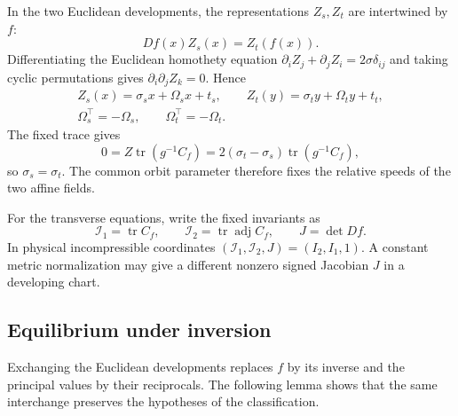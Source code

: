 \documentclass[11pt,a4paper]{article}
\numberwithin{equation}{section}
\theoremstyle{plain}
\theoremstyle{definition}
\theoremstyle{remark}
\begin{document}
In the two Euclidean developments, the representations $Z_s,Z_t$
are intertwined by $f$:
\begin{equation}\label{sim:intertwine}
Df(x)Z_s(x)=Z_t(f(x)).
\end{equation}
Differentiating the Euclidean homothety equation
$\partial_iZ_j+\partial_jZ_i=2\sigma\delta_{ij}$ and taking cyclic
permutations gives $\partial_i\partial_jZ_k=0$. Hence
\begin{equation}\label{sim:affine}
\begin{gathered}
Z_s(x)=\sigma_sx+\Omega_sx+t_s,\qquad
Z_t(y)=\sigma_ty+\Omega_ty+t_t,\\
\Omega_s^{\top}=-\Omega_s,\qquad \Omega_t^{\top}=-\Omega_t.
\end{gathered}
\end{equation}
The fixed trace gives
\begin{equation}\label{sim:tracefactor}
0=Z\operatorname{tr}(g^{-1}C_f)
=2(\sigma_t-\sigma_s)\operatorname{tr}(g^{-1}C_f),
\end{equation}
so $\sigma_s=\sigma_t$. The common orbit parameter therefore fixes
the relative speeds of the two affine fields.

For the transverse equations, write the fixed invariants as
\[
\mathcal I_1=\operatorname{tr}C_f,\qquad
\mathcal I_2=\operatorname{tr}\operatorname{adj}C_f,\qquad
J=\det Df.
\]
In physical incompressible coordinates
$(\mathcal I_1,\mathcal I_2,J)=(I_2,I_1,1)$.
A constant metric normalization may give a different nonzero
signed Jacobian $J$ in a developing chart.

\subsection{Equilibrium under inversion}

Exchanging the Euclidean developments replaces $f$ by its inverse
and the principal values by their reciprocals. The following lemma
shows that the same interchange preserves the hypotheses of the
classification.
\end{document}
